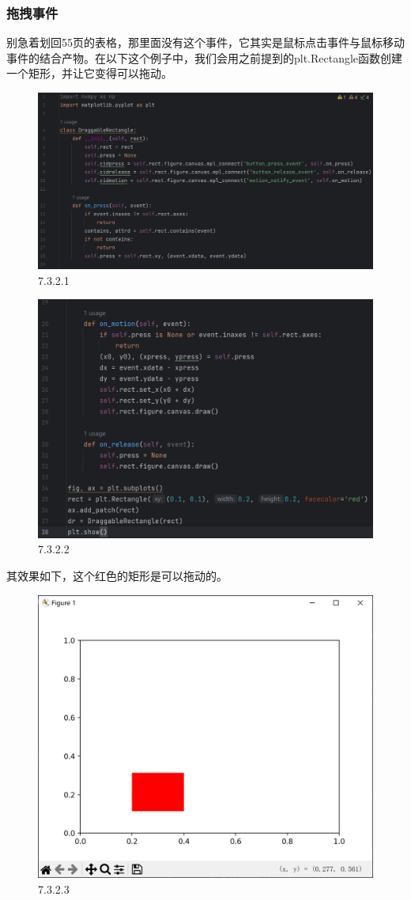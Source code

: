 \documentclass[12pt]{article}
\begin{document}
\subsubsection{拖拽事件}
别急着划回55页的表格，那里面没有这个事件，它其实是鼠标点击事件与鼠标移动事件的结合产物。在以下这个例子中，我们会用之前提到的plt.Rectangle函数创建一个矩形，并让它变得可以拖动。
\begin{figure}[H]
    \centering
    \includegraphics[width=0.75\linewidth]{拖拽事件 program1.png}
    \caption{7.3.2.1}
    \label{fig:enter-label}
\end{figure}
\begin{figure}[H]
    \centering
    \includegraphics[width=0.75\linewidth]{拖拽事件 program2.png}
    \caption{7.3.2.2}
    \label{fig:enter-label}
\end{figure}

其效果如下，这个红色的矩形是可以拖动的。
\begin{figure}[H]
    \centering
    \includegraphics[width=0.5\linewidth]{拖拽事件 Pic1.png}
    \caption{7.3.2.3}
    \label{fig:enter-label}
\end{figure}
\end{document}
